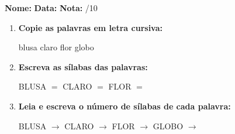\begin{exercicio}



\noindent\textbf{Nome:} \underline{\hspace{3.2cm}} \quad \textbf{Data:} \underline{\hspace{1.6cm}} \quad \textbf{Nota:} \underline{\hspace{0.9cm}}/10


\begin{enumerate}

  \item \textbf{Copie as palavras em letra cursiva:}
  \begin{center}
  blusa \quad claro \quad flor \quad globo
  \end{center}
  \begin{center}
  \underline{\hspace{2.4cm}} \quad \underline{\hspace{2.4cm}} \quad \underline{\hspace{2.4cm}} \quad \underline{\hspace{2.4cm}}
  \end{center}

  \item \textbf{Escreva as sílabas das palavras:}
  \begin{center}
  BLUSA $=$ \underline{\hspace{1.5cm}} \underline{\hspace{1.5cm}} \quad CLARO $=$ \underline{\hspace{1.5cm}} \underline{\hspace{1.5cm}} \quad FLOR $=$ \underline{\hspace{1.5cm}} \underline{\hspace{1.5cm}}
  \end{center}

  \item \textbf{Leia e escreva o número de sílabas de cada palavra:}
  \begin{center}
  BLUSA $\rightarrow$ \underline{\hspace{0.9cm}} \quad CLARO $\rightarrow$ \underline{\hspace{0.9cm}} \quad FLOR $\rightarrow$ \underline{\hspace{0.9cm}} \quad GLOBO $\rightarrow$ \underline{\hspace{0.9cm}}
  \end{center}


\end{enumerate}
\end{exercicio}
